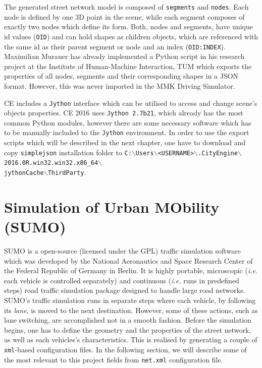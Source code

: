 The generated street network model is composed of \texttt{segments} and \texttt{nodes}. Each node is defined by one 3D point in the scene, while each segment composes of exactly two nodes which define its form. Both, nodes and segments, have unique id values (\texttt{OID}) and can hold shapes as children objects, which are referenced with the same id as their parent segment or node and an index (\texttt{OID:INDEX}). Maximilian Murauer has already implemented a Python script in his research project at the Institute of Human-Machine Interaction, TUM which exports the properties of all nodes, segments and their corresponding shapes in a JSON format. However, this was never imported in the MMK Driving Simulator.

CE includes a \texttt{Jython} interface which can be utilised to access and change scene's objects properties. CE 2016 uses \texttt{Jython 2.7b21}, which already has the most common Python modules, however there are some necessary software which has to be manually included to the \texttt{Jython} environment. In order to use the export scripts which will be described in the next chapter, one have to download and copy \texttt{simplejson} installation folder to \texttt{C:$\backslash$Users$\backslash$<USERNAME>$\backslash$.CityEngine$\backslash$2016.0R.win32.win32.x86\_64$\backslash$\\jythonCache$\backslash$ThirdParty}.

\section{Simulation of Urban MObility (SUMO)}
\label{ch:sumo}
SUMO is a open-source (licensed under the GPL) traffic simulation software which was developed by the National Aeronautics and Space Research Center of the Federal Republic of Germany in Berlin. It is highly portable, microscopic (\emph{i.e.} each vehicle is controlled separately) and continuous (\emph{i.e.} runs in predefined steps) road traffic simulation package designed to handle large road networks. SUMO's traffic simulation runs in separate steps where each vehicle, by following its \emph{lane}, is moved to the next destination. However, some of these actions, such as lane switching, are accomplished not in a smooth fashion. Before the simulation begins, one has to define the geometry and the properties of the street network, as well as each vehicles's characteristics. This is realised by generating a couple of \texttt{xml}-based configuration files. In the following section, we will describe some of the most relevant to this project fields from \texttt{net.xml} configuration file.

